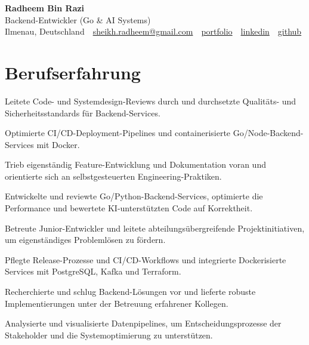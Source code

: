 \documentclass[11pt,a4paper]{resume}
\makeatletter
\newcommand{\Portfolio}{https://radheem.github.io/my-cv}
\newcommand{\PortfolioText}{portfolio}
\newcommand{\GitHub}{https://github.com/radheem}
\newcommand{\LinkedIn}{https://www.linkedin.com/in/radheem-razi}
\newcommand{\Email}{sheikh.radheem@gmail.com}
\makeatother
\begin{document}
\clearpage
{}

\begin{center}
  {\huge\bfseries Radheem Bin Razi}\\[3pt]
  {\large Backend-Entwickler (Go \& AI Systems)}\\[6pt]
  \small
  Ilmenau, Deutschland \,\textbar\,
  \href{mailto:\Email}{\Email} \,\textbar\,
  \href{\Portfolio}{\PortfolioText} \,\textbar\,
  \href{\LinkedIn}{linkedin} \,\textbar\,
  \href{\GitHub}{github}
\end{center}
\vspace{2pt}

\section{Berufserfahrung}

\bullets
  \item Leitete Code- und Systemdesign-Reviews durch und durchsetzte Qualitäts- und Sicherheitsstandards für Backend-Services.
  \item Optimierte CI/CD-Deployment-Pipelines und containerisierte Go/Node-Backend-Services mit Docker.
  \item Trieb eigenständig Feature-Entwicklung und Dokumentation voran und orientierte sich an selbstgesteuerten Engineering-Praktiken.
\bulletsend
\vspace{3pt}
\bullets
  \item Entwickelte und reviewte Go/Python-Backend-Services, optimierte die Performance und bewertete KI-unterstützten Code auf Korrektheit.
  \item Betreute Junior-Entwickler und leitete abteilungsübergreifende Projektinitiativen, um eigenständiges Problemlösen zu fördern.
  \item Pflegte Release-Prozesse und CI/CD-Workflows und integrierte Dockerisierte Services mit PostgreSQL, Kafka und Terraform.
\bulletsend
\vspace{3pt}
\bullets
  \item Recherchierte und schlug Backend-Lösungen vor und lieferte robuste Implementierungen unter der Betreuung erfahrener Kollegen.
  \item Analysierte und visualisierte Datenpipelines, um Entscheidungsprozesse der Stakeholder und die Systemoptimierung zu unterstützen.
\bulletsend
\vspace{3pt}
\end{document}
